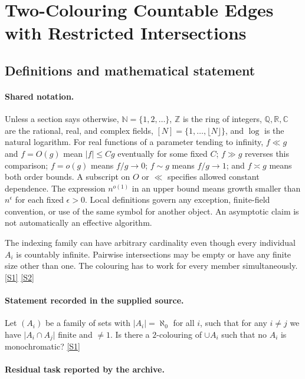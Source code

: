 \documentclass[11pt,a4paper]{article}
\newcommand{\N}{\mathbb{N}}
\newcommand{\Z}{\mathbb{Z}}
\newcommand{\Q}{\mathbb{Q}}
\newcommand{\R}{\mathbb{R}}
\newcommand{\C}{\mathbb{C}}
\newcommand{\sref}[2]{\hyperlink{source:#1:#2}{[S#2]}}
\begin{document}
\section{Two-Colouring Countable Edges with Restricted Intersections}\label{statement}


\subsection{Definitions and mathematical statement}

\paragraph{Shared notation.}Unless a section says otherwise, $\N=\{1,2,\ldots\}$,
$\Z$ is the ring of integers, $\Q,\R,\C$ are the rational, real, and complex
fields, $[N]=\{1,\ldots,\lfloor N\rfloor\}$, and $\log$ is the natural
logarithm. For real functions of a parameter tending to infinity,
$f\ll g$ and $f=O(g)$ mean $|f|\leq Cg$ eventually for some fixed $C$;
$f\gg g$ reverses this comparison; $f=o(g)$ means $f/g\to0$;
$f\sim g$ means $f/g\to1$; and $f\asymp g$ means both order bounds.
A subscript on $O$ or $\ll$ specifies allowed constant dependence.
The expression $n^{o(1)}$ in an upper bound means growth smaller than
$n^\epsilon$ for each fixed $\epsilon>0$. Local definitions govern any
exception, finite-field convention, or use of the same symbol for another
object. An asymptotic claim is not automatically an effective algorithm.



The indexing family can have arbitrary cardinality even though every individual $A_i$ is countably infinite. Pairwise intersections may be empty or have any finite size other than one. The colouring has to work for every member simultaneously. \sref{statement}{1} \sref{statement}{2}

\paragraph{Statement recorded in the supplied source.}
Let $(A_i)$ be a family of sets with $\lvert A_i\rvert=\aleph_0$ for all $i$, such that for any $i\neq j$ we have $\lvert A_i\cap A_j\rvert$ finite and $\neq 1$. Is there a $2$-colouring of $\cup A_i$ such that no $A_i$ is monochromatic? \sref{statement}{1}

\paragraph{Residual task reported by the archive.}
\end{document}
